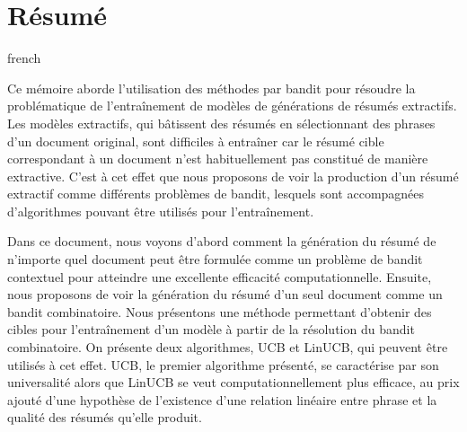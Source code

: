 \chapter*{Résumé}               %
\label{chap:resume}             %

\begin{otherlanguage*}{french}

Ce mémoire aborde l'utilisation des méthodes par bandit pour résoudre 
la problématique de l'entraînement de modèles de générations de résumés extractifs.
Les modèles extractifs, qui bâtissent des résumés en sélectionnant des phrases d'un 
document original, sont difficiles à entraîner car le résumé cible 
correspondant à un document n'est habituellement pas constitué de 
manière extractive.
C'est à cet effet que nous proposons de voir la production d'un résumé
extractif comme différents problèmes de bandit, lesquels sont 
accompagnées d'algorithmes pouvant être utilisés pour l'entraînement.

Dans ce document, nous voyons d'abord comment la génération du résumé 
de n'importe quel document peut être formulée comme un problème de bandit 
contextuel pour atteindre une excellente efficacité computationnelle.
Ensuite, nous proposons de voir la génération du résumé 
d'un seul document comme un bandit combinatoire.
Nous présentons une méthode permettant d'obtenir des cibles 
pour l'entraînement d'un modèle à partir de la résolution 
du bandit combinatoire.
On présente deux algorithmes, UCB et LinUCB, qui peuvent 
être utilisés à cet effet.
UCB, le premier algorithme présenté, se caractérise par 
son universalité alors que LinUCB se veut computationnellement
plus efficace, au prix ajouté d'une hypothèse de l'existence 
d'une relation linéaire entre phrase et la qualité des résumés 
qu'elle produit. 
\end{otherlanguage*}

